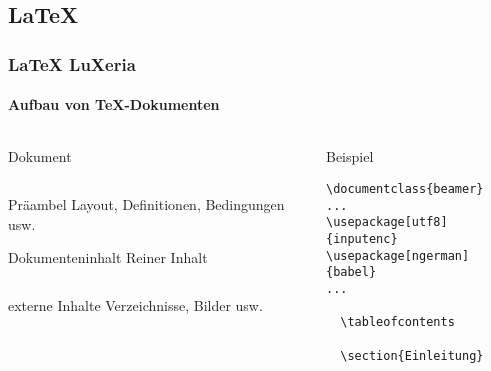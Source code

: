 \subsection{\LaTeX}
\begin{frame}[fragile]
    \frametitle{\LaTeX \hfill{} \footnotesize{LuXeria}}
    \framesubtitle{Aufbau von \TeX-Dokumenten}
    \begin{columns}
        \begin{column}{5cm}
            \begin{block}{Dokument}
                \begin{columns}
                \begin{column}{4cm}
                \begin{exampleblock}{Präambel}
                    Layout, Definitionen, Bedingungen usw.
                \end{exampleblock}
                \begin{exampleblock}{Dokumenteninhalt}
                    Reiner Inhalt
                    \begin{columns}
                        \begin{column}{3cm}
                            \begin{alertblock}{externe Inhalte}
                                Verzeichnisse, Bilder usw.
                            \end{alertblock}
                        \end{column}
                    \end{columns}
                \end{exampleblock}
            \end{column}
            \end{columns}
            \end{block}
        \end{column}
        \begin{column}{5cm}
            \begin{block}{Beispiel}
            \begin{lstlisting}
\documentclass{beamer}
...
\usepackage[utf8]{inputenc}
\usepackage[ngerman]{babel}
...

  \tableofcontents
            
  \section{Einleitung}
    
    
          
            \end{lstlisting}
            \end{block}
        \end{column}
    \end{columns}
\end{frame}


